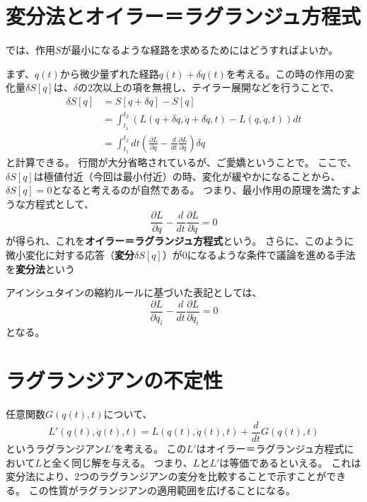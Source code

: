 \documentclass[a4paper]{jsreport}
\begin{document}
        \section{変分法とオイラー＝ラグランジュ方程式}
            では、作用$S$が最小になるような経路を求めるためにはどうすればよいか。\par
            まず、$q(t)$から微少量ずれた経路$q(t) + \delta q(t)$を考える。この時の作用の変化量$\delta S[q]$は、$\delta$の2次以上の項を無視し、テイラー展開などを行うことで、
            \begin{align}
                \delta S[q] &= S[q + \delta q] - S[q] \\
                &= \int_{t_1}^{t_2} \left( L(q + \delta q, \dot{q} + \delta \dot{q}, t) - L(q, \dot{q}, t) \right) dt \\
                &= \int_{t_1}^{t_2} dt \left( \frac{\partial L}{\partial q} - \frac{d}{dt} \frac{\partial L}{\partial \dot{q}} \right) \delta q
            \end{align}
            と計算できる。
            行間が大分省略されているが、ご愛嬌ということで。
            ここで、$\delta S[q]$は極値付近（今回は最小付近）の時、変化が緩やかになることから、$\delta S[q] = 0$となると考えるのが自然である。
            つまり、最小作用の原理を満たすような方程式として、
            \begin{equation}
                \frac{\partial L}{\partial q} - \frac{d}{dt} \frac{\partial L}{\partial \dot{q}} = 0
            \end{equation}
            が得られ、これを\textbf{オイラー＝ラグランジュ方程式}という。
            さらに、このように微小変化に対する応答（\textbf{変分$\delta S[q]$}）が$0$になるような条件で議論を進める手法を\textbf{変分法}という\par
            アインシュタインの縮約ルールに基づいた表記としては、
            \begin{equation}
                \frac{\partial L}{\partial q_i} - \frac{d}{dt} \frac{\partial L}{\partial \dot{q_i}} = 0
            \end{equation}
            となる。

        \section{ラグランジアンの不定性}
            任意関数$G(q(t), t)$について、
            \begin{equation}
                L'(q(t), \dot{q}(t), t) = L(q(t), \dot{q}(t), t) + \frac{d}{dt} G(q(t), t)
            \end{equation}
            というラグランジアン$L'$を考える。
            この$L'$はオイラー＝ラグランジュ方程式において$L$と全く同じ解を与える。
            つまり、$L$と$L'$は等価であるといえる。
            これは変分法により、2つのラグランジアンの変分を比較することで示すことができる。
            この性質がラグランジアンの適用範囲を広げることになる。
\end{document}
